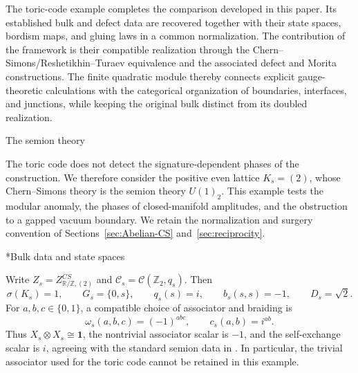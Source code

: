 \documentclass[12pt]{amsart}
\makeatletter
\renewcommand\subsection{\@startsection{subsection}{2}%
  \z@{.5\linespacing\@plus.7\linespacing}{-.5em}%
  {\normalfont\bfseries}}
\numberwithin{equation}{section}
\theoremstyle{definition}
\makeatother
\begin{document}
The toric-code example completes the comparison developed in this
paper. Its established bulk and defect data are recovered together
with their state spaces, bordism maps, and gluing laws in a common
normalization. The contribution of the framework is their compatible
realization through the Chern--Simons/Reshetikhin--Turaev equivalence
and the associated defect and Morita constructions. The finite
quadratic module thereby connects explicit gauge-theoretic
calculations with the categorical organization of boundaries,
interfaces, and junctions, while keeping the original bulk distinct
from its doubled realization.


\subsection{The semion theory}
\label{sec:semion-example}

The toric code does not detect the signature-dependent phases of the
construction. We therefore consider the positive even lattice $K_s=(2)$,
whose Chern--Simons theory is the semion theory $U(1)_2$. This example
tests the modular anomaly, the phases of closed-manifold amplitudes,
and the obstruction to a gapped vacuum boundary. We retain the
normalization and surgery convention of Sections~\ref{sec:Abelian-CS}
and~\ref{sec:reciprocity}.

\subsection*{Bulk data and state spaces}

Write $Z_s=Z^{CS}_{\mathbb R/\mathbb Z,(2)}$ and
$\mathcal C_s=\mathcal C(\mathbb Z_2,q_s)$. Then
\begin{equation}
\label{eq:semion-data}
\sigma(K_s)=1,\qquad G_s=\{0,s\},\qquad
q_s(s)=i,\qquad b_s(s,s)=-1,\qquad D_s=\sqrt2.
\end{equation}
For $a,b,c\in\{0,1\}$, a compatible choice of associator and braiding is
$$
\omega_s(a,b,c)=(-1)^{abc},\qquad c_s(a,b)=i^{ab}.
$$
Thus $X_s\otimes X_s\cong\mathbf1$, the nontrivial associator scalar
is $-1$, and the self-exchange scalar is $i$, agreeing with the standard
semion data in \cite[Section~5.3.1]{RowellStongWang2009}.
In particular, the trivial associator used for the toric code cannot
be retained in this example.
\end{document}
